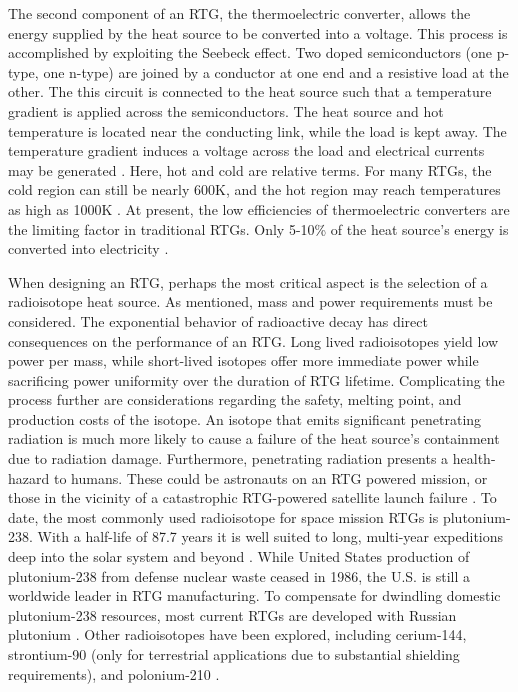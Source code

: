 \documentclass{article}
\newcommand{\tab}{\-\hspace{1cm}}
\begin{document}
\begin{multicols}{2}
\tab The second component of an RTG, the thermoelectric converter, allows the energy supplied by the heat source to be converted into a voltage. This process is accomplished by exploiting the Seebeck effect. Two doped semiconductors (one p-type, one n-type) are joined by a conductor at one end and a resistive load at the other. The this circuit is connected to the heat source such that a temperature gradient is applied across the semiconductors. The heat source and hot temperature is located near the conducting link, while the load is kept away. The temperature gradient induces a voltage across the load and electrical currents may be generated \cite{rowe,lange}. Here, hot and cold are relative terms. For many RTGs, the cold region can still be nearly 600K, and the hot region may reach temperatures as high as 1000K \cite{rowe}. At present, the low efficiencies of thermoelectric converters are the limiting factor in traditional RTGs. Only 5-10\% of the heat source's energy is converted into electricity \cite{lange,summerer}.

\tab When designing an RTG, perhaps the most critical aspect is the selection of a radioisotope heat source. As mentioned, mass and power requirements must be considered. The exponential behavior of radioactive decay has direct consequences on the performance of an RTG. Long lived radioisotopes yield low power per mass, while short-lived isotopes offer more immediate power while sacrificing power uniformity over the duration of RTG lifetime. Complicating the process further are considerations regarding the safety, melting point, and production costs of the isotope. An isotope that emits significant penetrating radiation is much more likely to cause a failure of the heat source's containment due to radiation damage. Furthermore, penetrating radiation presents a health-hazard to humans. These could be astronauts on an RTG powered mission, or those in the vicinity of a catastrophic RTG-powered satellite launch failure \cite{lange}. To date, the most commonly used radioisotope for space mission RTGs is plutonium-238. With a half-life of 87.7 years it is well suited to long, multi-year expeditions deep into the solar system and beyond \cite{lange}. While United States production of plutonium-238 from defense nuclear waste ceased in 1986, the U.S. is still a worldwide leader in RTG manufacturing. To compensate for dwindling domestic plutonium-238 resources, most current RTGs are developed with Russian plutonium \cite{lange}. Other radioisotopes have been explored, including cerium-144, strontium-90 (only for terrestrial applications due to substantial shielding requirements), and polonium-210 \cite{lange}.


\end{multicols}
\end{document}
